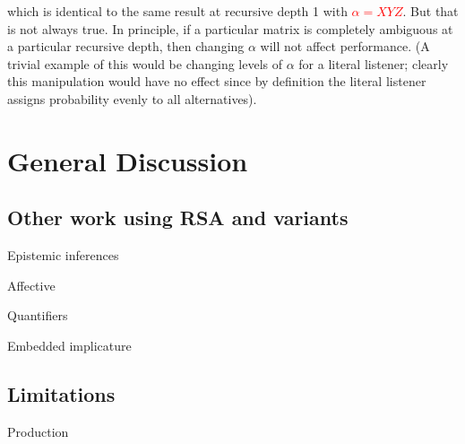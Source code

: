 \documentclass[man,noapacite]{apa2}
\newcommand{\red}[1]{\textcolor{red}{#1}}
\begin{document}
\noindent which is identical to the same result at recursive depth 1 with \red{$\alpha = XYZ$}. But that is not always true. In principle, if a particular matrix is completely ambiguous at a particular recursive depth, then changing $\alpha$ will not affect performance. (A trivial example of this would be changing levels of $\alpha$ for a literal listener; clearly this manipulation would have no effect since by definition the literal listener assigns probability evenly to all alternatives).

\section{General Discussion}
\label{sec:discussion}

%


\subsection{Other work using RSA and variants}

Epistemic inferences \cite{goodman2013}

Affective \cite{kao2014}


Quantifiers \cite{franke2013}


Embedded implicature \cite{potts2015}

\subsection{Limitations}

Production


\newpage




\newpage
\end{document}
